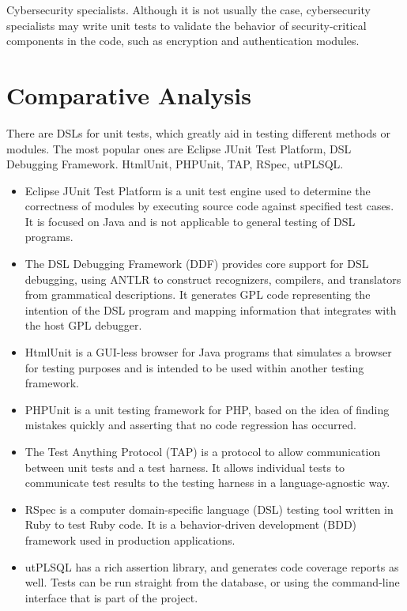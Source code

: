 Cybersecurity specialists. Although it is not usually the case, cybersecurity specialists may write unit tests to validate the behavior of security-critical components in the code, such as encryption and authentication modules. 

\section{Comparative Analysis}

There are DSLs for unit tests, which greatly aid in testing different methods or modules. The most popular ones are Eclipse JUnit Test Platform, DSL Debugging Framework. HtmlUnit, PHPUnit, TAP, RSpec, utPLSQL.

\begin{itemize}
    \item Eclipse JUnit Test Platform is a unit test engine used to determine the correctness of modules by executing source code against specified test cases. It is focused on Java and is not applicable to general testing of DSL programs.
    \item The DSL Debugging Framework (DDF) provides core support for DSL debugging, using ANTLR to construct recognizers, compilers, and translators from grammatical descriptions. It generates GPL code representing the intention of the DSL program and mapping information that integrates with the host GPL debugger.
    \item HtmlUnit is a GUI-less browser for Java programs that simulates a browser for testing purposes and is intended to be used within another testing framework.
    \item PHPUnit is a unit testing framework for PHP, based on the idea of finding mistakes quickly and asserting that no code regression has occurred.
    \item The Test Anything Protocol (TAP) is a protocol to allow communication between unit tests and a test harness. It allows individual tests to communicate test results to the testing harness in a language-agnostic way. 
    \item RSpec is a computer domain-specific language (DSL) testing tool written in Ruby to test Ruby code. It is a behavior-driven development (BDD) framework used in production applications.
    \item utPLSQL has a rich assertion library, and generates code coverage reports as well. Tests can be run straight from the database, or using the command-line interface that is part of the project.

\end{itemize}


